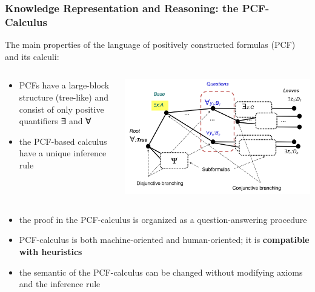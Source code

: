\documentclass[10pt]{beamer}
\begin{document}
\begin{frame}
  \frametitle{Knowledge Representation and Reasoning: the PCF-Calculus}
  The main properties of the language of positively constructed formulas (PCF) and its calculi:
  \begin{columns}
    \begin{column}{0.5\linewidth}
      \begin{itemize}
      \item PCFs have a large-block structure (tree-like) and consist of only positive quantifiers ∃ and ∀
      \item the PCF-based calculus have a unique inference rule
      \end{itemize}

    \end{column}
    \begin{column}{0.5\linewidth}
      \includegraphics[width=\linewidth]{pcf-block-struct.png}
    \end{column}
  \end{columns}
\begin{itemize}
\item the proof in the PCF-calculus is organized as a question-answering procedure
\item PCF-calculus is both machine-oriented and human-oriented; it is \textbf{compatible with heuristics}
\item the semantic of the PCF-calculus can be changed without modifying axioms and the inference rule
\end{itemize}
\end{frame}
\end{document}

